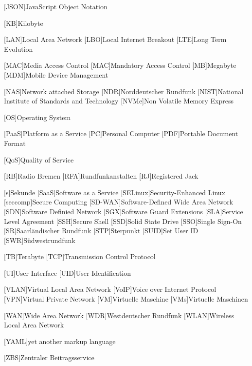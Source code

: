 \begin{acronym}[seccomp]
    [JSON]{JavaScript Object Notation}
    
    [KB]{Kilobyte}
    
    [LAN]{Local Area Network}
    [LBO]{Local Internet Breakout}
    [LTE]{Long Term Evolution}
    
    [MAC]{Media Access Control}
    [MAC]{Mandatory Access Control}
    [MB]{Megabyte}
    [MDM]{Mobile Device Management}
    
    [NAS]{Network attached Storage}
    [NDR]{Norddeutscher Rundfunk}
    [NIST]{National Institute of Standards and Technology}
    [NVMe]{Non Volatile Memory Express}
    
    [OS]{Operating System}
    
    [PaaS]{Platform as a Service}
    [PC]{Personal Computer}
    [PDF]{Portable Document Format}
    
    [QoS]{Quality of Service}
    
    [RB]{Radio Bremen}
    [RFA]{Rundfunkanstalten}
    [RJ]{Registered Jack}
    
    [s]{Sekunde}
    [SaaS]{Software as a Service}
    [SELinux]{Security-Enhanced Linux}
    [seccomp]{Secure Computing}
    [SD-WAN]{Software-Defined Wide Area Network}
    [SDN]{Software Definied Network}
    [SGX]{Software Guard Extensions}
    [SLA]{Service Level Agreement}
    [SSH]{Secure Shell}
    [SSD]{Solid State Drive}
    [SSO]{Single Sign-On}
    [SR]{Saarländischer Rundfunk}
    [STP]{Sterpunkt}
    [SUID]{Set User ID}
    [SWR]{Südwestrundfunk}
    
    [TB]{Terabyte}
    [TCP]{Transmission Control Protocol}
    
    [UI]{User Interface}
    [UID]{User Identification}
    
    [VLAN]{Virtual Local Area Network}
    [VoIP]{Voice over Internet Protocol}
    [VPN]{Virtual Private Network}
    [VM]{Virtuelle Maschine}
    [VMs]{Virtuelle Maschinen}
    
    [WAN]{Wide Area Network}
    [WDR]{Westdeutscher Rundfunk}
    [WLAN]{Wireless Local Area Network}

    [YAML]{yet another markup language}
    
    [ZBS]{Zentraler Beitragsservice}
\end{acronym}
